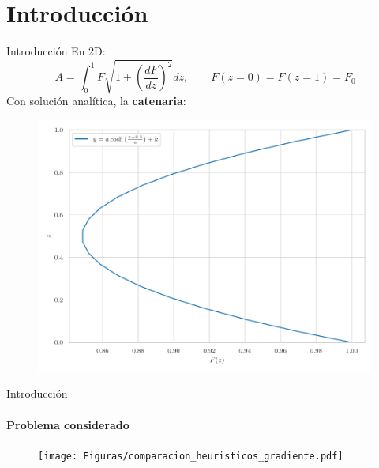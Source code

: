 \documentclass[11pt]{beamer}
\begin{document}
	\section{Introducción}
		\begin{frame}{Introducción}
			\justifying
			En 2D:
                \begin{equation*}
                    A = \int_0^1 F \sqrt{1 + \left( \frac{dF}{dz} \right)^2} dz , \qquad F(z = 0) = F(z = 1) = F_0
                \end{equation*}
                Con solución analítica, la \textbf{catenaria}:
                \begin{figure}
                    \centering
                    \includegraphics[width= 0.6 \textwidth, height=\textheight, keepaspectratio]{Figuras/catenaria.pdf}
                \end{figure}
		\end{frame}
  		
		\begin{frame}{Introducción}
            \framesubtitle{Problema considerado}
			\justifying
			\begin{figure}
                    \centering
                    \texttt{[image: Figuras/comparacion\_heuristicos\_gradiente.pdf]}
                \end{figure}
		\end{frame}
\end{document}
